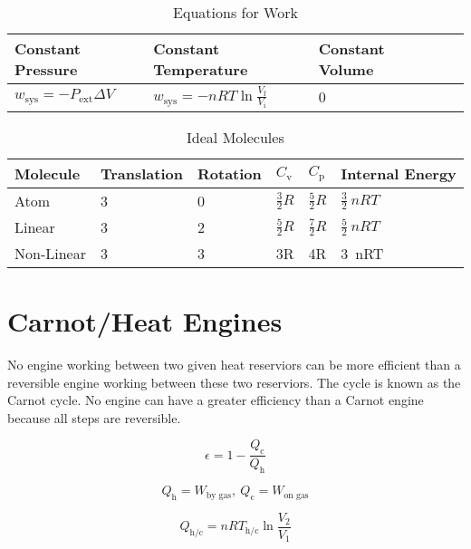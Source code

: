 \documentclass{article}
\begin{document}
\begin{table}[h]
\centering
\caption{Equations for Work}
\label{my-label}
\def\arraystretch{1.5}
\begin{tabular}{|l|l|l|l|l|}
\hline
Constant Pressure & Constant Temperature & Constant Volume   \\
\hline
$w_\text{sys} = - P_{\text{ext}} \Delta V$   & $w_\text{sys} = - n R T\ln{\frac{V_\text{f}}{V_\text{i}}}$ & 0 \\
\hline
\end{tabular}
\end{table}

\begin{table}[h!]
\centering
\caption{Ideal Molecules}
\label{my-label}
\def\arraystretch{1.5}
\begin{tabular}{|l|l|l|l|l|l|}
\hline
Molecule & Translation & Rotation & $C_\text{v}$ & $C_\text{p}$ & Internal Energy  \\
\hline
Atom & 3 & 0 & $\frac{3}{2}R$ & $\frac{5}{2}R$ & $\frac{3}{2}\ nRT$\\
\hline
Linear & 3 & 2 & $\frac{5}{2}R$& $\frac{7}{2}R$ & $\frac{5}{2}\ nRT$\\
\hline
Non-Linear & 3 & 3 & 3R & 4R & 3\ nRT\\
\hline
\end{tabular}
\end{table}

\section{Carnot/Heat Engines}

No engine working between two given heat reserviors can be more efficient than a reversible engine working between these two reserviors. The cycle is known as the Carnot cycle. No engine can have a greater efficiency than a Carnot engine because all steps are reversible.

\begin{equation*}
\epsilon = 1 - \frac{Q_\text{c}}{Q_\text{h}}
\end{equation*}

\begin{equation*}
Q_\text{h} = W_\text{by gas},\ Q_\text{c} = W_\text{on gas} 
\end{equation*}

\begin{equation*}
Q_\text{h/c} = nRT_\text{h/c} \ln\frac{V_\text{2}}{V_\text{1}}
\end{equation*}
\end{document}

